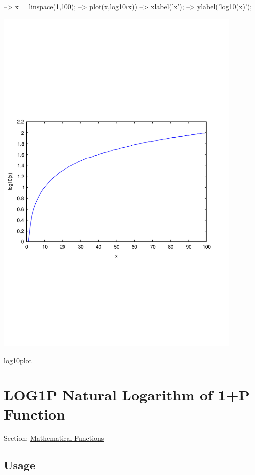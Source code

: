 \begin{DoxyVerbInclude}
--> x = linspace(1,100);
--> plot(x,log10(x))
--> xlabel('x');
--> ylabel('log10(x)');
\end{DoxyVerbInclude}


 
\begin{DoxyImage}
\includegraphics[width=12cm]{log10plot}
\caption{log10plot}
\end{DoxyImage}
 \hypertarget{mathfunctions_log1p}{}\section{L\-O\-G1\-P Natural Logarithm of 1+\-P Function}\label{mathfunctions_log1p}
Section\-: \hyperlink{sec_mathfunctions}{Mathematical Functions} \hypertarget{vtkwidgets_vtkxyplotwidget_Usage}{}\subsection{Usage}\label{vtkwidgets_vtkxyplotwidget_Usage}
